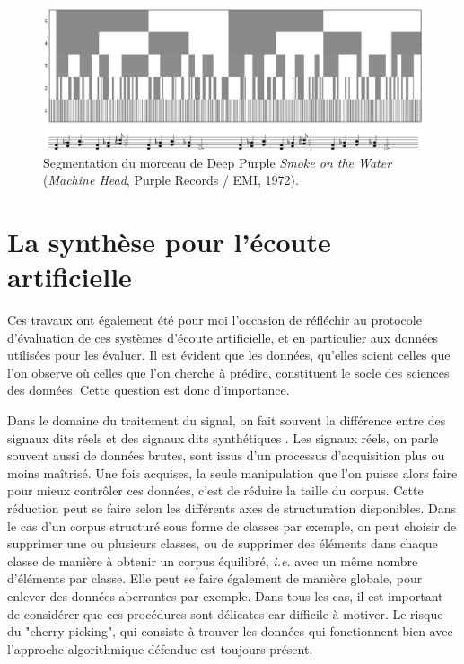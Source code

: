 \begin{figure}[t]
  \includegraphics[width=\textwidth]{figures/smokeCrop}
  \caption{Segmentation du morceau de Deep Purple \emph{Smoke on the Water} (\emph{Machine Head}, Purple Records / EMI, 1972).}  \label{fig:smoke}
\end{figure}

\section{ \nmu La  synthèse pour l'écoute artificielle} \label{sec:dcase}

Ces travaux ont également été pour moi l'occasion de réfléchir au protocole d'évaluation de ces systèmes d'écoute artificielle, et en particulier aux données utilisées pour les évaluer. Il est évident que les données, qu'elles soient celles que l'on observe où celles que l'on cherche à prédire, constituent le socle des sciences des données. Cette question est donc d'importance.

Dans le domaine du traitement du signal, on fait souvent la différence entre des signaux dits \og réels \fg et des signaux dits \og synthétiques \fg. Les signaux réels, on parle souvent aussi de données brutes, sont issus d'un processus d'acquisition plus ou moins maîtrisé. Une fois acquises, la seule manipulation que l'on puisse alors faire pour mieux contrôler ces données, c'est de réduire la taille du corpus. Cette réduction peut se faire selon les différents axes de structuration disponibles. Dans le cas d'un corpus structuré sous forme de classes par exemple, on peut choisir de supprimer une ou plusieurs classes, ou de supprimer des éléments dans chaque classe de manière à obtenir un corpus équilibré, \textit{i.e.} avec un même nombre d'éléments par classe. Elle peut se faire également de manière globale, pour enlever des données aberrantes par exemple. Dans tous les cas, il est important de considérer que ces procédures sont délicates car difficile à motiver. Le risque du "cherry picking", qui consiste à trouver les données qui fonctionnent bien avec l'approche algorithmique défendue est toujours présent.

